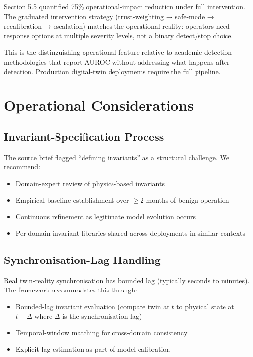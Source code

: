 \documentclass[sigconf,nonacm]{acmart}
\begin{document}
Section 5.5 quantified 75\% operational-impact reduction under
full intervention. The graduated intervention strategy
(trust-weighting → safe-mode → recalibration → escalation)
matches the operational reality: operators need response options
at multiple severity levels, not a binary detect/stop choice.

This is the distinguishing operational feature relative to
academic detection methodologies that report AUROC without
addressing what happens after detection. Production digital-twin
deployments require the full pipeline.

\section{Operational Considerations}

\subsection{Invariant-Specification Process}

The source brief flagged ``defining invariants'' as a structural
challenge. We recommend:

\begin{itemize}
  \item Domain-expert review of physics-based invariants
  \item Empirical baseline establishment over $\geq 2$ months of
        benign operation
  \item Continuous refinement as legitimate model evolution
        occurs
  \item Per-domain invariant libraries shared across deployments
        in similar contexts
\end{itemize}

\subsection{Synchronisation-Lag Handling}

Real twin-reality synchronisation has bounded lag (typically
seconds to minutes). The framework accommodates this through:

\begin{itemize}
  \item Bounded-lag invariant evaluation (compare twin at $t$ to
        physical state at $t-\Delta$ where $\Delta$ is the
        synchronisation lag)
  \item Temporal-window matching for cross-domain consistency
  \item Explicit lag estimation as part of model calibration
\end{itemize}
\end{document}
